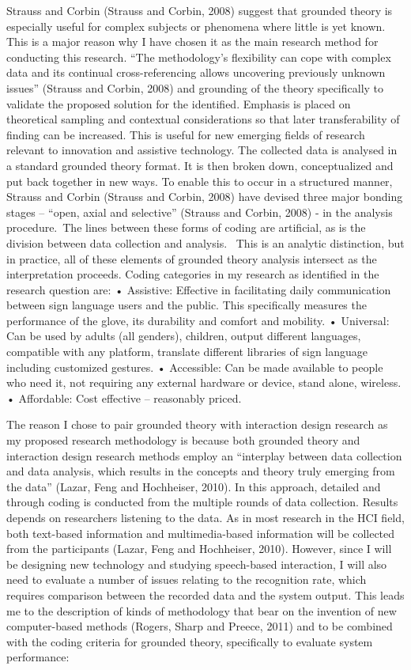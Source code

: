 Strauss and Corbin (Strauss and Corbin, 2008) suggest that grounded theory is especially useful for complex subjects or phenomena where little is yet known. This is a major reason why I have chosen it as the main research method for conducting this research.  “The methodology’s ﬂexibility can cope with complex data and its continual cross-referencing allows uncovering previously unknown issues” (Strauss and Corbin, 2008) and grounding of the theory specifically to validate the proposed solution for the identified.  Emphasis is placed on theoretical sampling and contextual considerations so that later transferability of finding can be increased. 
This is useful for new emerging fields of research relevant to innovation and assistive technology. 
The collected data is analysed in a standard grounded theory format. It is then broken down, conceptualized and put back together in new ways.  To enable this to occur in a structured manner, Strauss and Corbin (Strauss and Corbin, 2008) have devised three major bonding stages – “open, axial and selective” (Strauss and Corbin, 2008) - in the analysis procedure. The lines between these forms of coding are artificial, as is the division between data collection and analysis.  This is an analytic distinction, but in practice, all of these elements of grounded theory analysis intersect as the interpretation proceeds.
Coding categories in my research as identified in the research question are:
•	Assistive:  Effective in facilitating daily communication between sign language users and the public.  This specifically measures the performance of the glove, its durability and comfort and mobility.
•	Universal: Can be used by adults (all genders), children, output different languages, compatible with any platform, translate different libraries of sign language including customized gestures.
•	Accessible: Can be made available to people who need it, not requiring any external hardware or device, stand alone, wireless.
•	Affordable: Cost effective – reasonably priced.

The reason I chose to pair grounded theory with interaction design research as my proposed research methodology is because both grounded theory and interaction design research methods employ an “interplay between data collection and data analysis, which results in the concepts and theory truly emerging from the data” (Lazar, Feng and Hochheiser, 2010). In this approach, detailed and through coding is conducted from the multiple rounds of data collection.  Results depends on researchers listening to the data.  As in most research in the HCI field, both text-based information and multimedia-based information will be collected from the participants (Lazar, Feng and Hochheiser, 2010). 
However, since I will be designing new technology and studying speech-based interaction, I will also need to evaluate a number of issues relating to the recognition rate, which requires comparison between the recorded data and the system output. 
This leads me to the description of kinds of methodology that bear on the invention of new computer-based methods (Rogers, Sharp and Preece, 2011) and to be combined with the coding criteria for grounded theory, specifically to evaluate system performance: 

